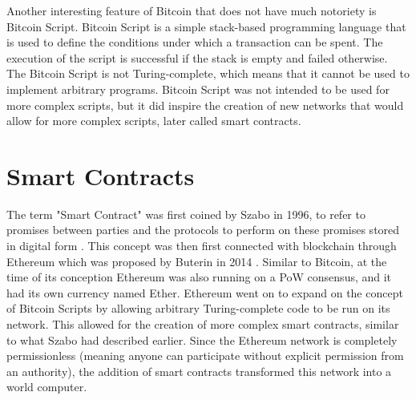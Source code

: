 Another interesting feature of Bitcoin that does not have much notoriety is Bitcoin Script. Bitcoin Script is a simple stack-based programming language that is used to define the conditions under which a transaction can be spent. The execution of the script is successful if the stack is empty and failed otherwise. The Bitcoin Script is not Turing-complete, which means that it cannot be used to implement arbitrary programs. Bitcoin Script was not intended to be used for more complex scripts, but it did inspire the creation of new networks that would allow for more complex scripts, later called smart contracts.

\section{Smart Contracts}
The term "Smart Contract" was first coined by Szabo in 1996, to refer to promises between parties and the protocols to perform on these promises stored in digital form \cite{szabo_smart_1996}. This concept was then first connected with blockchain through Ethereum which was proposed by Buterin in 2014 \cite{buterin_ethereum_2014}. Similar to Bitcoin, at the time of its conception Ethereum was also running on a \ac{PoW} consensus, and it had its own currency named Ether. Ethereum went on to expand on the concept of Bitcoin Scripts by allowing arbitrary Turing-complete code to be run on its network. This allowed for the creation of more complex smart contracts, similar to what Szabo had described earlier. Since the Ethereum network is completely permissionless (meaning anyone can participate without explicit permission from an authority), the addition of smart contracts transformed this network into a world computer.

